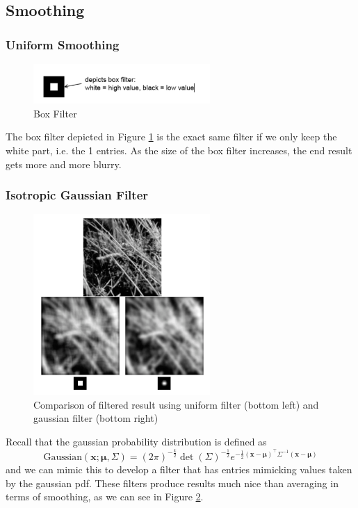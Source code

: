 \documentclass[11pt]{article}
\newcommand{\bx}{\mathbf{x}}
\begin{document}
\subsection{Smoothing}
\subsubsection{Uniform Smoothing}
\begin{figure}[H]
	\center\includegraphics[width=0.6\textwidth]{figs/box_filter}
	\caption{Box Filter}\label{fig:box_filter}
\end{figure}
The box filter depicted in Figure \ref{fig:box_filter} is the exact same filter if we only keep the white part, i.e. the 1 entries. As the size of the box filter increases, the end result gets more and more blurry. 

\subsubsection{Isotropic Gaussian Filter}
\begin{figure}[H]
	\center\includegraphics[width=0.6\textwidth]{figs/filter_comp}
	\caption{Comparison of filtered result using uniform filter (bottom left) and gaussian filter (bottom right)}
	\label{fig:filter_comp}
\end{figure}
Recall that the gaussian probability distribution is defined as 
\begin{equation}
	\text{Gaussian}(\bx; \boldsymbol{\mu}, \Sigma ) = (2 \pi)^{-\frac{k}{2}} \operatorname{det}(\Sigma)^{-\frac{1}{2}} e^{-\frac{1}{2}(\mathbf{x}-\boldsymbol{\mu})^{\top} \Sigma^{-1}(\mathbf{x}-\boldsymbol{\mu})}
\end{equation}
and we can mimic this to develop a filter that has entries mimicking values taken by the gaussian pdf. These filters produce results much nice than averaging in terms of smoothing, as we can see in Figure \ref{fig:filter_comp}.
\end{document}
